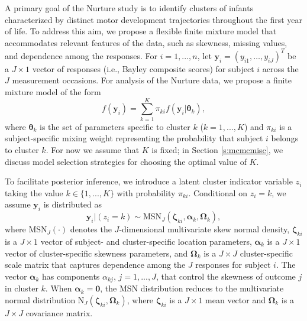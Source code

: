 \documentclass[useAMS,referee]{biom}
\begin{document}
A primary goal of the Nurture study is to identify clusters of infants characterized by distinct motor development trajectories throughout the first year of life. To address this aim, we propose a flexible finite mixture model that accommodates relevant features of the data, such as skewness, missing values, and dependence among the responses. For $i = 1,...,n$, let $\mathbf{y}_{i}=(y_{i1},\ldots,y_{iJ})^T$ be a $J \times 1$ vector of responses (i.e., Bayley composite scores) for subject $i$ across the $J$ measurement occasions. For analysis of the Nurture data, we propose a finite mixture model of the form
\begin{equation}
	\label{eq:mixture}
f(\mathbf{y}_i) = \sum_{k = 1}^{K} \pi_{ki} f(\mathbf{y}_i|\boldsymbol\theta_k),
\end{equation}
where $\boldsymbol\theta_k$ is the set of parameters specific to cluster $k$ ($k = 1,...,K$) and $\pi_{ki}$ is a subject-specific mixing weight representing the probability that subject $i$ belongs to cluster $k$. For now we assume that $K$ is fixed; in Section \ref{s:mcmcmisc}, we discuss model selection strategies for choosing the optimal value of $K$. 

To facilitate posterior inference, we introduce a latent cluster indicator variable $z_i$ taking the value $k \in \{1,...,K\}$ with probability $\pi_{ki}$. Conditional on $z_i = k$, we assume $\mathbf{y}_{i}$ is distributed as
\begin{equation}
\mathbf{y}_{i}|(z_i=k) \sim \text{MSN}_J(\boldsymbol\zeta_{ki},\boldsymbol\alpha_k,\boldsymbol\Omega_k), \label{eq:msndens}
\end{equation}
where $\text{MSN}_J(\cdot)$ denotes the $J$-dimensional multivariate skew normal density, $\boldsymbol\zeta_{ki}$ is a $J \times 1$ vector of subject- and cluster-specific location parameters, $\boldsymbol\alpha_k$ is a $J \times 1$ vector of cluster-specific skewness parameters, and $\boldsymbol\Omega_k$ is a $J \times J$ cluster-specific scale matrix that captures dependence among the $J$ responses for subject $i$. The vector $\boldsymbol\alpha_k$ has components $\alpha_{kj}$, $j = 1,...,J$, that control the skewness of outcome $j$ in cluster $k$. When $\boldsymbol\alpha_k = \mathbf{0}$, the MSN distribution reduces to the multivariate normal distribution $\text{N}_J(\boldsymbol\zeta_{ki},\boldsymbol\Omega_k)$, where $\boldsymbol\zeta_{ki}$ is a $J \times 1$ mean vector and $\boldsymbol\Omega_k$ is a $J \times J$ covariance matrix.
\end{document}
